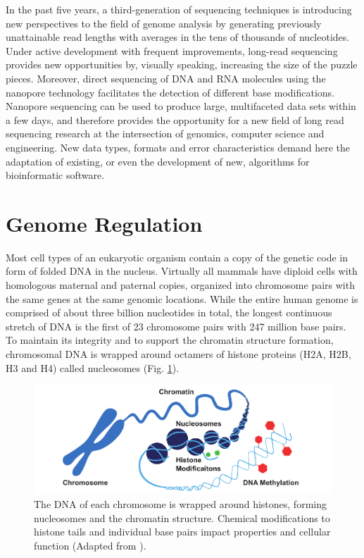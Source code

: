 In the past five years, a third-generation of sequencing techniques is introducing new perspectives to the field of genome analysis by generating previously unattainable read lengths with averages in the tens of thousands of nucleotides. 
Under active development with frequent improvements, long-read sequencing provides new opportunities by, visually speaking, increasing the size of the puzzle pieces.
Moreover, direct sequencing of DNA and RNA molecules using the nanopore technology facilitates the detection of different base modifications.
Nanopore sequencing can be used to produce large, multifaceted data sets within a few days, and therefore provides the opportunity for a new field of long read sequencing research at the intersection of genomics, computer science and engineering. 
New data types, formats and error characteristics demand here the adaptation of existing, or even the development of new, algorithms for bioinformatic software.




\section{Genome Regulation}
\label{sec:intro:bio}

Most cell types of an eukaryotic organism contain a copy of the genetic code in form of folded DNA in the nucleus.
Virtually all mammals have diploid cells with homologous maternal and paternal copies, organized into chromosome pairs with the same genes at the same genomic locations.
While the entire human genome is comprised of about three billion nucleotides in total, the longest continuous stretch of DNA is the first of 23 chromosome pairs with 247 million base pairs. 
To maintain its integrity and to support the chromatin structure formation, chromosomal DNA is wrapped around octamers of histone proteins (H2A, H2B, H3 and H4) called nucleosomes (Fig. \ref{fig:intro:chromatin}).


\begin{figure}[h]
	\centering
	\includegraphics[width=1.0\textwidth]{figures/intro/chromatin.pdf}
	\captionsetup{format=plain}
	\caption[Chromosome to nucleotide structure]{The DNA of each chromosome is wrapped around histones, forming nucleosomes and the chromatin structure. Chemical modifications to histone tails and individual base pairs impact properties and cellular function (Adapted from \cite{zymo2020}).}
	\label{fig:intro:chromatin}
\end{figure}

